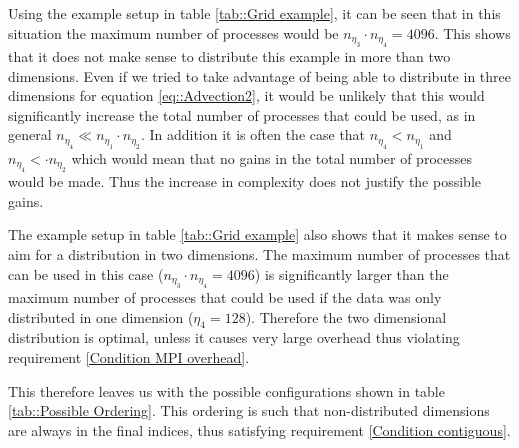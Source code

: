 Using the example setup in table \ref{tab::Grid example}, it can be seen that in this situation the maximum number of processes would be $n_{\eta_3}\!\!\cdot n_{\eta_4} = 4096$. This shows that it does not make sense to distribute this example in more than two dimensions. Even if we tried to take advantage of being able to distribute in three dimensions for equation \ref{eq::Advection2}, it would be unlikely that this would significantly increase the total number of processes that could be used, as in general $n_{\eta_4}\ll n_{\eta_1}\cdot n_{\eta_2}$. In addition it is often the case that $n_{\eta_4}< n_{\eta_1}$ and $n_{\eta_4}<\cdot n_{\eta_2}$ which would mean that no gains in the total number of processes would be made. Thus the increase in complexity does not justify the possible gains. 

The example setup in table \ref{tab::Grid example} also shows that it makes sense to aim for a distribution in two dimensions. The maximum number of processes that can be used in this case ($n_{\eta_3}\!\!\cdot n_{\eta_4} = 4096$) is significantly larger than the maximum number of processes that could be used if the data was only distributed in one dimension ($\eta_4=128$). Therefore the two dimensional distribution is optimal, unless it causes very large overhead thus violating requirement \ref{Condition MPI overhead}.

This therefore leaves us with the possible configurations shown in table \ref{tab::Possible Ordering}. This ordering is such that non-distributed dimensions are always in the final indices, thus satisfying requirement \ref{Condition contiguous}.

